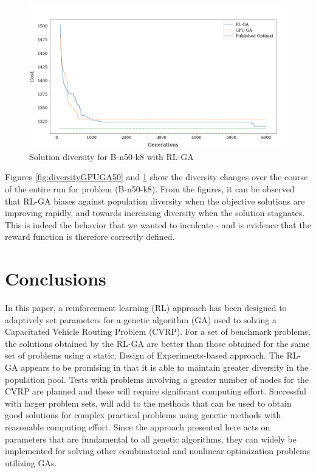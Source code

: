 \documentclass[acmsmall]{acmart}
\begin{document}
\begin{figure}[h] 
\begin{centering}
\includegraphics[scale=0.17]{figs/moving average diversity RL-GA.png}
\par\end{centering}
\begin{centering}
\caption{Solution diversity for B-n50-k8 with RL-GA}\label{fig:diversityRLGA50}
\par\end{centering}
\end{figure}

Figures %
\ref{fig:diversityGPUGA50} and \ref{fig:diversityRLGA50} show the diversity changes over the course of the entire run for problem (B-n50-k8). From the figures, it can be observed that RL-GA biases against population diversity when the objective solutions are improving rapidly, and towards increasing diversity when the solution stagnates. %
This is indeed the behavior that we wanted to inculcate - and is evidence that the reward function is therefore correctly defined. 


\section{Conclusions}\label{sec:conclusions}
In this paper, a reinforcement learning (RL) approach has been designed to adaptively set parameters for a genetic algorithm (GA) used to solving a Capacitated Vehicle Routing Problem (CVRP). For a set of benchmark problems, the solutions obtained by the RL-GA are better than those obtained for the same set of problems using a static, Design of Experiments-based approach. The RL-GA appears to be promising in that it is able to maintain greater diversity in the population pool.  Tests with problems involving a greater number of nodes for the CVRP are  planned and these will require significant computing effort. Successful with  larger problem sets, will add to the methods that can be used to obtain good solutions for complex practical problems using genetic methods with reasonable computing effort.
Since the approach presented here acts on parameters that are fundamental to all genetic algorithms, they can widely be implemented for solving other combinatorial and nonlinear optimization problems utilizing GAs.   



\end{document}
